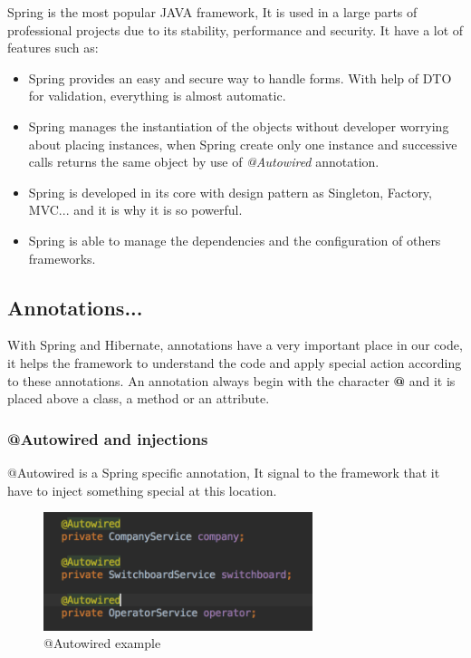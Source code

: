 Spring is the most popular JAVA framework, It is used in a large parts of professional projects due to its stability, performance and security.
It have a lot of features such as:

\begin{itemize}  
\item Spring provides an easy and secure way to handle forms. With help of DTO for validation, everything is almost automatic.

\item Spring manages the instantiation of the objects without developer worrying about placing instances, when Spring create only one instance and successive calls returns the same object by use of \textit{@Autowired} annotation.

\item Spring is developed in its core with design pattern as Singleton, Factory, MVC... and it is why it is so powerful.
\item Spring is able to manage the dependencies and the configuration of others frameworks.
\end{itemize}  



\subsection{Annotations...}

With Spring and Hibernate, annotations have a very important place in our code, it helps the framework to understand the code and apply special action according to these annotations.
An annotation always begin with the character \textbf{@} and it is placed above a class, a method or an attribute.

\subsubsection{@Autowired and injections}
@Autowired is a Spring specific annotation, It signal to the framework that it have to inject something special at this location.

\begin{figure}[!ht]
  \caption{@Autowired example}
  \centering
    \includegraphics[width=0.7\textwidth]{img/autowired.png}
\end{figure}

